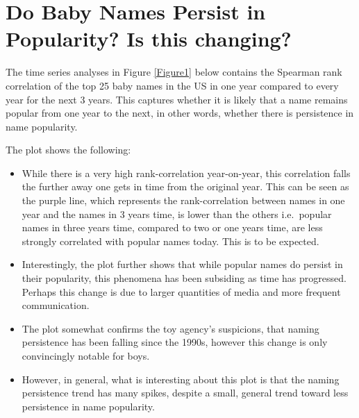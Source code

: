 \documentclass[11pt,preprint, authoryear]{elsarticle}
\numberwithin{equation}{section}
\numberwithin{figure}{section}
\numberwithin{table}{section}
\begin{document}
\hypertarget{do-baby-names-persist-in-popularity-is-this-changing}{%
\section{\texorpdfstring{Do Baby Names Persist in Popularity? Is this
changing?
\label{persist}}{Do Baby Names Persist in Popularity? Is this changing? }}\label{do-baby-names-persist-in-popularity-is-this-changing}}

The time series analyses in Figure \ref{Figure1} below contains the
Spearman rank correlation of the top 25 baby names in the US in one year
compared to every year for the next 3 years. This captures whether it is
likely that a name remains popular from one year to the next, in other
words, whether there is persistence in name popularity.

The plot shows the following:

\begin{itemize}
\item
  While there is a very high rank-correlation year-on-year, this
  correlation falls the further away one gets in time from the original
  year. This can be seen as the purple line, which represents the
  rank-correlation between names in one year and the names in 3 years
  time, is lower than the others i.e.~popular names in three years time,
  compared to two or one years time, are less strongly correlated with
  popular names today. This is to be expected.
\item
  Interestingly, the plot further shows that while popular names do
  persist in their popularity, this phenomena has been subsiding as time
  has progressed. Perhaps this change is due to larger quantities of
  media and more frequent communication.
\item
  The plot somewhat confirms the toy agency's suspicions, that naming
  persistence has been falling since the 1990s, however this change is
  only convincingly notable for boys.
\item
  However, in general, what is interesting about this plot is that the
  naming persistence trend has many spikes, despite a small, general
  trend toward less persistence in name popularity.
\end{itemize}
\end{document}
